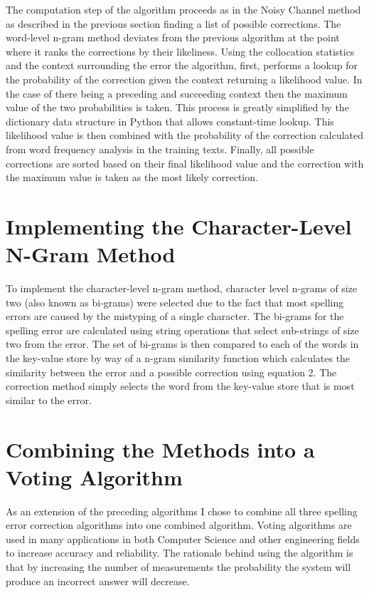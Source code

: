 The computation step of the algorithm proceeds as in the Noisy Channel method as described in the previous section finding a list of possible corrections. The word-level n-gram method deviates from the previous algorithm at the point where it ranks the corrections by their likeliness. Using the collocation statistics and the context surrounding the error the algorithm, first, performs a lookup for the probability of the correction given the context returning a likelihood value. In the case of there being a preceding and succeeding context then the maximum value of the two probabilities is taken. This process is greatly simplified by the dictionary data structure in Python that allows constant-time lookup. This likelihood value is then combined with the probability of the correction calculated from word frequency analysis in the training texts. Finally, all possible corrections are sorted based on their final likelihood value and the correction with the maximum value is taken as the most likely correction.

\section{Implementing the Character-Level N-Gram Method}
To implement the character-level n-gram method, character level n-grams of size two (also known as bi-grams) were selected due to the fact that most spelling errors are caused by the mistyping of a single character. The bi-grams for the spelling error are calculated using string operations that select sub-strings of size two from the error. The set of bi-grams is then compared to each of the words in the key-value store by way of a n-gram similarity function which calculates the similarity between the error and a possible correction using equation 2. The correction method simply selects the word from the key-value store that is most similar to the error.

\section{Combining the Methods into a Voting Algorithm}
As an extension of the preceding algorithms I chose to combine all three spelling error correction algorithms into one combined algorithm. Voting algorithms are used in many applications in both Computer Science and other engineering fields to increase accuracy and reliability. The rationale behind using the algorithm is that by increasing the number of measurements the probability the system will produce an incorrect answer will decrease.

